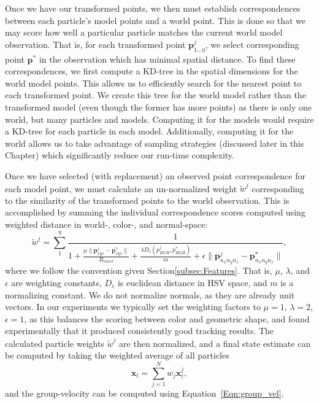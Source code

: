 Once we have our transformed points, we then must establish correspondences between each particle's model points and a world point. This is done so that we may score how well a particular particle matches the current world model observation. That is, for each transformed point $\mathbf{p}^j_{1\dotso \eta}$, we select corresponding point $\mathbf{p}^*$ in the observation which has minimal spatial distance.
To find these correspondences, we first compute a KD-tree in the spatial dimensions for the world model points. This allows us to efficiently search for the nearest point to each transformed point. We create this tree for the world model rather than the transformed model (even though the former has more points) as there is only one world, but many particles and models. Computing it for the models would require a KD-tree for each particle in each model. Additionally, computing it for the world allows us to take advantage of sampling strategies (discussed later in this Chapter) which significantly reduce our run-time complexity. 

Once we have selected (with replacement) an observed point correspondence for each model point, we must calculate an un-normalized weight $\tilde{w}^j$ corresponding to the similarity of the transformed points to the world observation. This is accomplished   by summing the individual correspondence scores computed using weighted distance in world-, color-, and normal-space:
\begin{equation} \label{eqn:distance}
  \tilde{w}^j = \sum_{1}^{\eta} \frac{1}{1 + \frac {\mu \lVert \mathbf{p}^j_{xyz} - \mathbf{p}^*_{xyz} \rVert} {R_{voxel}} +  \frac{\lambda D_c(p^j_{RGB},p^*_{RGB})}{m} +   \epsilon \lVert \mathbf{p}^j_{n_x n_y n_z} - \mathbf{p}^*_{n_x n_y n_z} \rVert}, 
\end{equation}
where we follow the convention given Section\ref{subsec:Features}. That is, $\mu$, $\lambda$, and $\epsilon$ are weighting constants, $D_c$ is euclidean distance in HSV space, and $m$ is a normalizing constant. We do not normalize normals, as they are already unit vectors. In our experiments we typically set the weighting factors to $\mu=1$, $\lambda=2$, $\epsilon=1$, as this balances the scoring between color and geometric shape, and found experimentally that it produced consistently good tracking results. The calculated particle weights $\tilde{w}^j$ are then normalized, and a final state estimate can be computed by taking the weighted average of all particles
\begin{equation} 
\mathbf{x}_t = \sum_{j=1}^{N} w_j \mathbf{x}^j_{t}, 
\end{equation}
and the group-velocity can be computed using Equation~\ref{Eqn:group_vel}.

